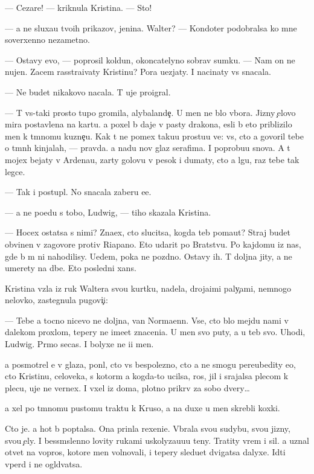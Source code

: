 \documentclass[10pt]{book}
\begin{document}
— Cezare! — kriknula Kristina. — Sto{\y}!

— {\Y}a ne sluxa{\y}u tvo{\y}ih prikazov, jen{\x}ina. Walter? — Kondot{\y}er podobralsa ko mne soverxenno nezametno.

— Ostavy {\y}evo, — poprosil koldun, okoncatelyno sobrav sumku. — Nam on ne nujen. Zacem rasstra{\y}ivaty Kristinu? Pora u{\y}ezjaty. I nacinaty vs{\e} snacala.

— Ne budet nikakovo nacala. T{\yi} uje proigral.

— T{\yi} vs{\e}-taki prosto tupo{\y} gromila, alybalande{\c}. U men{\ia} ne b{\yi}lo v{\yi}bora. Jizny {\c}elovo mira postavlena na kartu. {\Y}a poxel b{\yi} daje v pasty drakona, {\y}esli b{\yi} eto priblizilo men{\ia} k t{\e}mnomu kuzne{\c}u. Kak t{\yi} ne po{\y}mex taku{\y}u prostu{\y}u ve{\x}: vs{\e}, cto {\y}a govoril tebe o t{\e}mn{\yi}h kinjalah, — pravda. {\Y}a na{\y}du nov{\yi}{\y} glaz serafima. I poprobu{\y}u snova. A t{\yi} mojex bejaty v Ardenau, zar{\yi}ty golovu v pesok i dumaty, cto {\y}a lgu, raz tebe tak legce.

— Tak i postupl{\iu}. No snacala zaberu {\y}e{\y}e.

— {\Y}a ne po{\y}edu s tobo{\y}, Ludwig, — tiho skazala Kristina.

— Hocex ostatsa s nimi? Zna{\y}ex, cto slucitsa, kogda teb{\ia} po{\y}ma{\y}ut? Straj budet obvinen v zagovore protiv Riapano. Eto udarit po Bratstvu. Po kajdomu iz nas, gde b{\yi} m{\yi} ni nahodilisy. U{\y}edem, poka ne pozdno. Ostavy ih. T{\yi} doljna jity, a ne umerety na d{\yi}be. Eto posledni{\y} xans.

Kristina vz{\ia}la iz ruk Waltera svo{\y}u kurtku, nadela, droja{\x}imi paly{\c}ami, nemnogo nelovko, zastegnula pugovi{\c}i:

— Tebe {\y}a tocno nicevo ne doljna, van Normaenn. Vse, cto b{\yi}lo mejdu nami v dalekom proxlom, tepery ne ime{\y}et znaceni{\y}a. U men{\ia} svo{\y} puty, a u teb{\ia} svo{\y}. Uhodi, Ludwig. Pr{\ia}mo se{\y}cas. I bolyxe ne i{\x}i men{\ia}.

{\Y}a posmotrel {\y}e{\y} v glaza, pon{\ia}l, cto vs{\e} bespolezno, cto {\y}a ne smogu pereubedity {\y}e{\y}o, cto Kristinu, celoveka, s kotor{\yi}m {\y}a kogda-to ucilsa, ros, jil i srajalsa plecom k plecu, uje ne vernex. I v{\yi}xel iz doma, plotno prikr{\yi}v za sobo{\y} dvery…

{\Y}a xel po t{\e}mnomu pustomu traktu k Kruso, a na duxe u men{\ia} skrebli koxki.

Cto je. {\Y}a hot{\ia} b{\yi} pop{\yi}talsa. Ona prin{\ia}la rexeni{\y}e. V{\yi}brala svo{\y}u sudybu, svo{\y}u jizny, svo{\y}u {\c}ely. I bessm{\yi}slenno lovity rukami uskolyza{\y}u{\x}u{\y}u teny. Tratity vrem{\ia} i sil{\yi}. {\Y}a uznal otvet{\yi} na vopros{\yi}, kotor{\yi}{\y}e men{\ia} volnovali, i tepery sledu{\y}et dvigatsa dalyxe. Idti vper{\e}d i ne ogl{\ia}d{\yi}vatsa.
\end{document}
